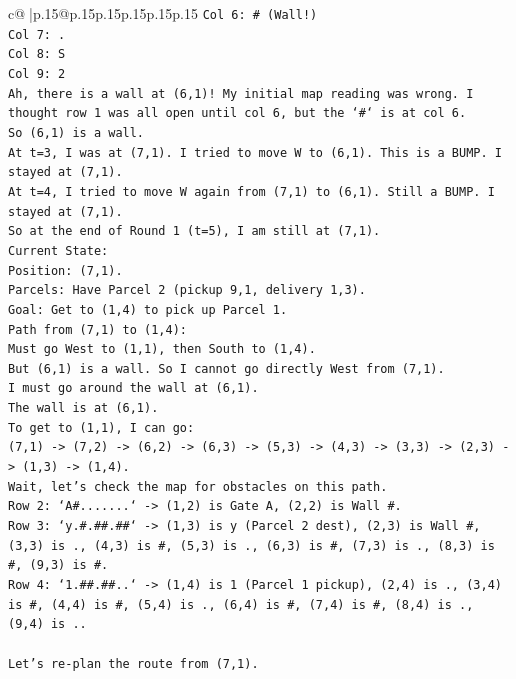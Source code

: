 \documentclass{article}
\begin{document}
{\begin{supertabular}{c@{$\;$}|p{.15\linewidth}@{}p{.15\linewidth}p{.15\linewidth}p{.15\linewidth}p{.15\linewidth}p{.15\linewidth}}
{{{\texttt{Col 6: \# (Wall!)} \\
\texttt{Col 7: .} \\
\texttt{Col 8: S} \\
\texttt{Col 9: 2} \\
\texttt{Ah, there is a wall at (6,1)! My initial map reading was wrong. I thought row 1 was all open until col 6, but the `\#` is at col 6.} \\
\texttt{So (6,1) is a wall.} \\
\texttt{At t=3, I was at (7,1). I tried to move W to (6,1). This is a BUMP. I stayed at (7,1).} \\
\texttt{At t=4, I tried to move W again from (7,1) to (6,1). Still a BUMP. I stayed at (7,1).} \\
\texttt{So at the end of Round 1 (t=5), I am still at (7,1).} \\
\texttt{Current State:} \\
\texttt{Position: (7,1).} \\
\texttt{Parcels: Have Parcel 2 (pickup 9,1, delivery 1,3).} \\
\texttt{Goal: Get to (1,4) to pick up Parcel 1.} \\
\texttt{Path from (7,1) to (1,4):} \\
\texttt{Must go West to (1,1), then South to (1,4).} \\
\texttt{But (6,1) is a wall. So I cannot go directly West from (7,1).} \\
\texttt{I must go around the wall at (6,1).} \\
\texttt{The wall is at (6,1).} \\
\texttt{To get to (1,1), I can go:} \\
\texttt{(7,1) {-}> (7,2) {-}> (6,2) {-}> (6,3) {-}> (5,3) {-}> (4,3) {-}> (3,3) {-}> (2,3) {-}> (1,3) {-}> (1,4).} \\
\texttt{Wait, let's check the map for obstacles on this path.} \\
\texttt{Row 2: `A\#.......` {-}> (1,2) is Gate A, (2,2) is Wall \#.} \\
\texttt{Row 3: `y.\#.\#\#.\#\#` {-}> (1,3) is y (Parcel 2 dest), (2,3) is Wall \#, (3,3) is ., (4,3) is \#, (5,3) is ., (6,3) is \#, (7,3) is ., (8,3) is \#, (9,3) is \#.} \\
\texttt{Row 4: `1.\#\#.\#\#..` {-}> (1,4) is 1 (Parcel 1 pickup), (2,4) is ., (3,4) is \#, (4,4) is \#, (5,4) is ., (6,4) is \#, (7,4) is \#, (8,4) is ., (9,4) is ..} \\
\\ 
\texttt{Let's re{-}plan the route from (7,1).} \\
}}}
\end{supertabular}}
\end{document}
